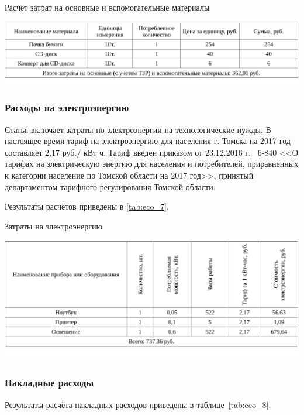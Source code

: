 \begin{table}[!ht]
\caption{Расчёт затрат на основные и вспомогательные материалы}
\centering
\includegraphics[page=1, width=1\linewidth]{tables/economics/econom.pdf}
\label{tab:eco_6}
\end{table}


\subsubsection{Расходы на электроэнергию}

Статья включает затраты по электроэнергии на технологические нужды. В настоящее время тариф на электроэнергию для населения г. Томска на 2017 год составляет 2,17 руб./ кВт ч. Тариф введен 
приказом от 23.12.2016 г. \textnumero~6-840 <<О тарифах на электрическую энергию для населения и 
потребителей, приравненных к категории население по Томской области на 2017 год>>, 
принятый департаментом тарифного регулирования Томской области.

Результаты расчётов приведены в \ref{tab:eco_7}.

\begin{table}[!ht]
\caption{Затраты на электроэнергию}
\centering
\includegraphics[page=1, width=1\linewidth]{tables/economics/econom_2.pdf}
\label{tab:eco_7}
\end{table}


\subsubsection{Накладные расходы}

Результаты расчёта накладных расходов приведены в таблице~\ref{tab:eco_8}.

